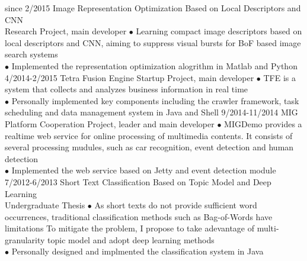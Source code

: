 \documentclass[]{friggeri-cv}
\begin{document}
\begin{entrylist}
  \entry
    {since 2/2015}
    {Image Representation Optimization Based on Local Descriptors and CNN \\ }
    {Research Project, main developer}
    {$\bullet$ Learning compact image descriptors based on local descriptors and CNN, aiming to suppress visual bursts for BoF based image search systems \\
    $\bullet$ Implemented the representation optimization alogrithm in Matlab and Python}
  \entry
    {4/2014-2/2015}
    {Tetra Fusion Engine}
    {Startup Project, main developer}
    {$\bullet$ TFE is a system that collects and analyzes business information in real time \\
    $\bullet$ Personally implemented key components including the crawler framework, task scheduling and data management system in Java and Shell}
  \entry
    {9/2014-11/2014}
    {MIG Platform}
    {Cooperation Project, leader and main developer}
    {$\bullet$ MIGDemo provides a realtime web service for online processing of multimedia contents. It consists of several processing mudules, such as car recognition, event detection and human detection\\
    $\bullet$ Implemented the web service based on Jetty and event detection module}
  \entry
    {7/2012-6/2013}
    {Short Text Classification Based on Topic Model and Deep Learning \\ }
    {Undergraduate Thesis}
    {$\bullet$ As short texts do not provide sufficient word occurrences, traditional classification methods such as Bag-of-Words have limitations
    To mitigate the problem, I propose to take adevantage of multi-granularity topic model and adopt deep learning methods \\
    $\bullet$ Personally designed and implmented the classification system in Java}
\end{entrylist}
\end{document}
